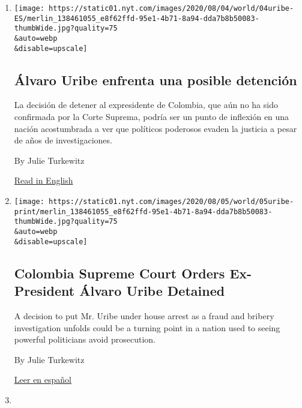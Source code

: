 \begin{enumerate}
\def\labelenumi{\arabic{enumi}.}
\item
  \href{/es/2020/08/04/espanol/america-latina/alvaro-uribe-detencion-colombia.html}{}

  \texttt{[image: https://static01.nyt.com/images/2020/08/04/world/04uribe-ES/merlin\_138461055\_e8f62ffd-95e1-4b71-8a94-dda7b8b50083-thumbWide.jpg?quality=75\\\&auto=webp\\\&disable=upscale]}

  \hypertarget{uxe1lvaro-uribe-enfrenta-una-posible-detenciuxf3n}{%
  \subsection{Álvaro Uribe enfrenta una posible
  detención}\label{uxe1lvaro-uribe-enfrenta-una-posible-detenciuxf3n}}

  La decisión de detener al expresidente de Colombia, que aún no ha sido
  confirmada por la Corte Suprema, podría ser un punto de inflexión en
  una nación acostumbrada a ver que políticos poderosos evaden la
  justicia a pesar de años de investigaciones.

  By Julie Turkewitz

  \href{https://www.nytimes.com/2020/08/04/world/americas/colombia-president-uribe-charged.html}{Read
  in English}
\item
  \href{/2020/08/04/world/americas/colombia-president-uribe-charged.html}{}

  \texttt{[image: https://static01.nyt.com/images/2020/08/05/world/05uribe-print/merlin\_138461055\_e8f62ffd-95e1-4b71-8a94-dda7b8b50083-thumbWide.jpg?quality=75\\\&auto=webp\\\&disable=upscale]}

  \hypertarget{colombia-supreme-court-orders-ex-president-uxe1lvaro-uribe-detained}{%
  \subsection{Colombia Supreme Court Orders Ex-President Álvaro Uribe
  Detained}\label{colombia-supreme-court-orders-ex-president-uxe1lvaro-uribe-detained}}

  A decision to put Mr. Uribe under house arrest as a fraud and bribery
  investigation unfolds could be a turning point in a nation used to
  seeing powerful politicians avoid prosecution.

  By Julie Turkewitz

  \href{https://www.nytimes.com/es/2020/08/04/espanol/america-latina/alvaro-uribe-detencion-colombia.html}{Leer
  en español}
\item
  \href{/interactive/2020/07/25/world/americas/coronavirus-brazil-amazon.html}{}


\end{enumerate}
